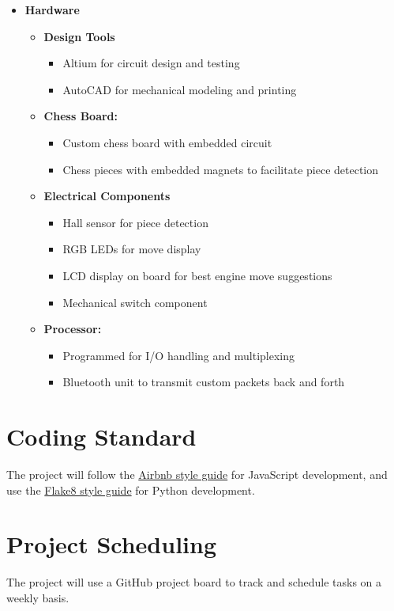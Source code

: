 \documentclass{article}
\begin{document}
\begin{itemize}
\item \textbf{Hardware}
\begin{itemize}
    \item \textbf{Design Tools}
    \begin{itemize}
        \item Altium for circuit design and testing
        \item AutoCAD for mechanical modeling and printing
    \end{itemize}
    \item \textbf{Chess Board:}
    \begin{itemize}
        \item Custom chess board with embedded circuit 
        \item Chess pieces with embedded magnets to facilitate piece detection
    \end{itemize}
    \item \textbf{Electrical Components}
    \begin{itemize}
        \item Hall sensor for piece detection
        \item RGB LEDs for move display
        \item LCD display on board for best engine move suggestions
        \item Mechanical switch component
    \end{itemize}
    \item \textbf{Processor:}
    \begin{itemize}
        \item Programmed for I/O handling and multiplexing
        \item Bluetooth unit to transmit custom packets back and forth
    \end{itemize}

\end{itemize}
\end{itemize}

\section{Coding Standard}
{The project will follow the \href{https://github.com/airbnb/javascript}{Airbnb style guide} for JavaScript development, and use the \href{https://flake8.pycqa.org/en/latest/}{Flake8 style guide} for Python development.}

\section{Project Scheduling}
{The project will use a GitHub project board to track and schedule tasks on a weekly basis.} 
\end{document}
